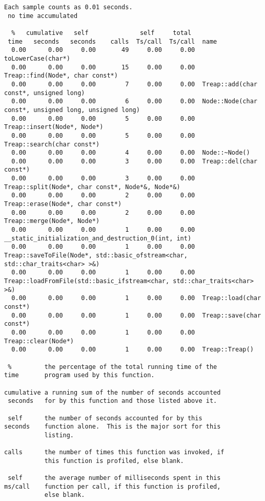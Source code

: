 \documentclass[12pt]{article}
\begin{document}
\begin{lstlisting}[breaklines]
Each sample counts as 0.01 seconds.
 no time accumulated

  %   cumulative   self              self     total           
 time   seconds   seconds    calls  Ts/call  Ts/call  name    
  0.00      0.00     0.00       49     0.00     0.00  toLowerCase(char*)
  0.00      0.00     0.00       15     0.00     0.00  Treap::find(Node*, char const*)
  0.00      0.00     0.00        7     0.00     0.00  Treap::add(char const*, unsigned long)
  0.00      0.00     0.00        6     0.00     0.00  Node::Node(char const*, unsigned long, unsigned long)
  0.00      0.00     0.00        5     0.00     0.00  Treap::insert(Node*, Node*)
  0.00      0.00     0.00        5     0.00     0.00  Treap::search(char const*)
  0.00      0.00     0.00        4     0.00     0.00  Node::~Node()
  0.00      0.00     0.00        3     0.00     0.00  Treap::del(char const*)
  0.00      0.00     0.00        3     0.00     0.00  Treap::split(Node*, char const*, Node*&, Node*&)
  0.00      0.00     0.00        2     0.00     0.00  Treap::erase(Node*, char const*)
  0.00      0.00     0.00        2     0.00     0.00  Treap::merge(Node*, Node*)
  0.00      0.00     0.00        1     0.00     0.00  __static_initialization_and_destruction_0(int, int)
  0.00      0.00     0.00        1     0.00     0.00  Treap::saveToFile(Node*, std::basic_ofstream<char, std::char_traits<char> >&)
  0.00      0.00     0.00        1     0.00     0.00  Treap::loadFromFile(std::basic_ifstream<char, std::char_traits<char> >&)
  0.00      0.00     0.00        1     0.00     0.00  Treap::load(char const*)
  0.00      0.00     0.00        1     0.00     0.00  Treap::save(char const*)
  0.00      0.00     0.00        1     0.00     0.00  Treap::clear(Node*)
  0.00      0.00     0.00        1     0.00     0.00  Treap::Treap()

 %         the percentage of the total running time of the
time       program used by this function.

cumulative a running sum of the number of seconds accounted
 seconds   for by this function and those listed above it.

 self      the number of seconds accounted for by this
seconds    function alone.  This is the major sort for this
           listing.

calls      the number of times this function was invoked, if
           this function is profiled, else blank.

 self      the average number of milliseconds spent in this
ms/call    function per call, if this function is profiled,
           else blank.


\end{lstlisting}
\end{document}
